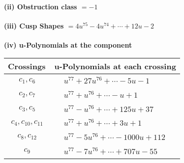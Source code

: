 \documentclass[1p]{elsarticle_modified}
\theoremstyle{definition}
\begin{document}
\flushleft \textbf{(ii) Obstruction class $= -1$}\\~\\
\flushleft \textbf{(iii) Cusp Shapes $= 4 u^{75}-4 u^{74}+\cdots+12 u-2$}\\~\\
\newpage\renewcommand{\arraystretch}{1}
\flushleft \textbf{(iv) u-Polynomials at the component}\newline \\
\begin{tabular}{m{50pt}|m{274pt}}
Crossings & \hspace{64pt}u-Polynomials at each crossing \\
\hline $$\begin{aligned}c_{1},c_{6}\end{aligned}$$&$\begin{aligned}
&u^{77}+27 u^{76}+\cdots-5 u-1
\end{aligned}$\\
\hline $$\begin{aligned}c_{2},c_{7}\end{aligned}$$&$\begin{aligned}
&u^{77}+u^{76}+\cdots- u+1
\end{aligned}$\\
\hline $$\begin{aligned}c_{3},c_{5}\end{aligned}$$&$\begin{aligned}
&u^{77}- u^{76}+\cdots+125 u+37
\end{aligned}$\\
\hline $$\begin{aligned}c_{4},c_{10},c_{11}\end{aligned}$$&$\begin{aligned}
&u^{77}+u^{76}+\cdots+3 u+1
\end{aligned}$\\
\hline $$\begin{aligned}c_{8},c_{12}\end{aligned}$$&$\begin{aligned}
&u^{77}-5 u^{76}+\cdots-1000 u+112
\end{aligned}$\\
\hline $$\begin{aligned}c_{9}\end{aligned}$$&$\begin{aligned}
&u^{77}-7 u^{76}+\cdots+707 u-55
\end{aligned}$\\
\hline
\end{tabular}\\~\\
\end{document}
